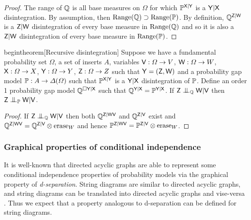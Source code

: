 \begin{proof}
The range of $\mathbb{Q}$ is all base measures on $\Omega$ for which $\mathbb{P}^{\mathsf{X}|\mathsf{Y}}$ is a $\mathsf{Y}|\mathsf{X}$ disintegration. By assumption, then $\text{Range}(\mathbb{Q})\supset\text{Range}(\mathbb{P})$. By definition, $\mathbb{Q}^{\mathsf{Z}|\mathsf{W}}$ is a $\mathsf{Z}|\mathsf{W}$ disintegration of every base measure in $\text{Range}(\mathbb{Q})$ and so it is also a $\mathsf{Z}|\mathsf{W}$ disintegration of every base measure in $\text{Range}(\mathbb{P})$.
\end{proof}

\begin{corollary}
begin{theorem}[Recursive disintegration]\label{th:recursive-disint}
Suppose we have a fundamental probability set $\Omega$, a set of inserts $A$, variables $\mathsf{V}:\Omega\to V$, $\mathsf{W}:\Omega\to W$, $\mathsf{X}:\Omega\to X$, $\mathsf{Y}:\Omega\to Y$, $\mathsf{Z}:\Omega\to Z$ such that $\mathsf{Y}=(\mathsf{Z},\mathsf{W})$ and a probability gap model $\mathbb{P}:A\to \Delta(\Omega)$ such that $\mathbb{P}^{\mathsf{X}|\mathsf{Y}}$ is a $\mathsf{Y}|\mathsf{X}$ disintegration of $\mathbb{P}$. Define an order 1 probability gap model $\mathbb{Q}^{\square \mathsf{Y}|\mathsf{X}}$ such that $\mathbb{Q}^{\mathsf{Y}|\mathsf{X}}=\mathbb{P}^{\mathsf{Y}|\mathsf{X}}$. If $\RV{Z}\CI_{\prob{Q}}\RV{W}|\RV{V}$ then $\RV{Z}\CI_{\prob{P}}\RV{W}|\RV{V}$.
\end{corollary}

\begin{proof}
If $\RV{Z}\CI_{\prob{Q}}\RV{W}|\RV{V}$ then both $\mathbb{Q}^{\mathsf{Z}|\mathsf{WV}}$ and $\mathbb{Q}^{\mathsf{Z}|\mathsf{V}}$ exist and $\mathbb{Q}^{\mathsf{Z}|\mathsf{WV}}=\mathbb{Q}^{\mathsf{Z}|\mathsf{V}}\otimes\text{erase}_{W}$ and hence $\mathbb{P}^{\mathsf{Z}|\mathsf{WV}}=\mathbb{P}^{\mathsf{Z}|\mathsf{V}}\otimes\text{erase}_{W}$.
\end{proof}

\subsubsection{Graphical properties of conditional independence}

It is well-known that directed acyclic graphs are able to represent some conditional independence properties of probability models via the graphical property of \emph{d-separation}. String diagrams are similar to directed acyclic graphs, and string diagrams can be translated into directed acyclic graphs and vise-versa \citep{fong_causal_2013}. Thus we expect that a property analogous to d-separation can be defined for string diagrams.

